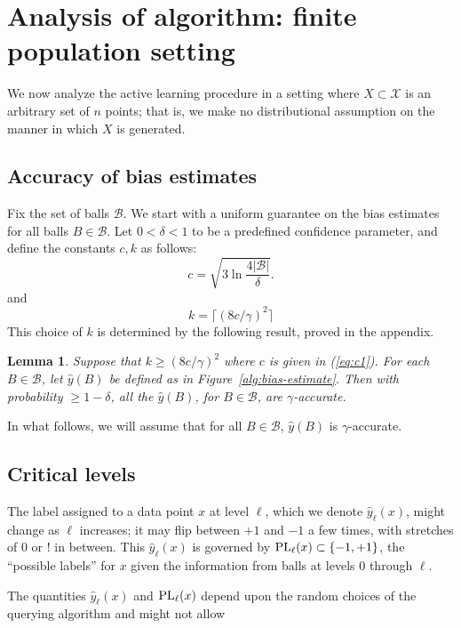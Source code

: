 \documentclass{article}
\def\X{{\mathcal X}}
\def\B{{\mathcal B}}
\def\yh{{\widehat{y}}}
\def\PL{{\mbox{\rm PL}}}
\newtheorem{lemma}[thm]{Lemma}
\begin{document}
\section{Analysis of algorithm: finite population setting}

We now analyze the active learning procedure in a setting where $X \subset \X$ is an arbitrary set of $n$ points; that is, we make no distributional assumption on the manner in which $X$ is generated.

\subsection{Accuracy of bias estimates}

Fix the set of balls $\B$. We start with a uniform guarantee on the
bias estimates for all balls $B \in \B$.  Let $0 < \delta < 1$ to be a
predefined confidence parameter, and define the constants $c,k$ as
follows:
\begin{equation}
c = \sqrt{3 \ln \frac{4|\B|}{\delta}} .
\label{eq:c1}
\end{equation}
and
\begin{equation}
  k =  \lceil (8c/\gamma)^2\rceil
\end{equation}
This choice of $k$ is determined by the following result, proved in the appendix.
\begin{lemma}
Suppose that $k \geq (8c/\gamma)^2$ where $c$ is given in (\ref{eq:c1}). 
For each $B \in \B$, let $\yh(B)$ be defined as in Figure~\ref{alg:bias-estimate}. Then with probability $\geq 1-\delta$, all the $\yh(B)$, for $B \in \B$, are $\gamma$-accurate.
\label{lemma:accurate-bias-estimates}
\end{lemma}

In what follows, we will assume that for all  $B \in \B$, $\yh(B)$ is $\gamma$-accurate.


\subsection{Critical levels}

The label assigned to a data point $x$ at level $\ell$, which we denote $\yh_\ell(x)$, might change as $\ell$ increases; it may flip between $+1$ and $-1$ a few times, with stretches of $0$ or $!$ in between. This $\yh_\ell(x)$ is governed by $\PL_\ell(x) \subset \{-1,+1\}$, the ``possible labels'' for $x$ given the information from balls at levels $0$ through $\ell$. 

The quantities $\yh_\ell(x)$ and $\PL_\ell(x)$ depend upon the random choices of the querying algorithm and might not allow
\end{document}
